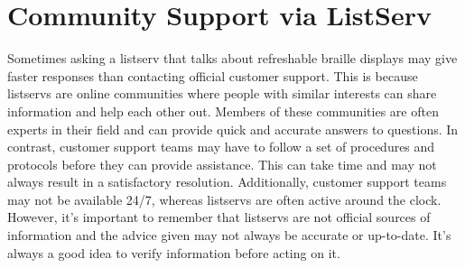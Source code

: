 \hypertarget{listserv2}{}\section{Community Support via ListServ}\label{listserv2}
Sometimes asking a listserv that talks about refreshable braille displays may give faster responses than contacting official customer support. This is because listservs are online communities where people with similar interests can share information and help each other out. Members of these communities are often experts in their field and can provide quick and accurate answers to questions. In contrast, customer support teams may have to follow a set of procedures and protocols before they can provide assistance. This can take time and may not always result in a satisfactory resolution. Additionally, customer support teams may not be available 24/7, whereas listservs are often active around the clock. However, it’s important to remember that listservs are not official sources of information and the advice given may not always be accurate or up-to-date. It’s always a good idea to verify information before acting on it.
